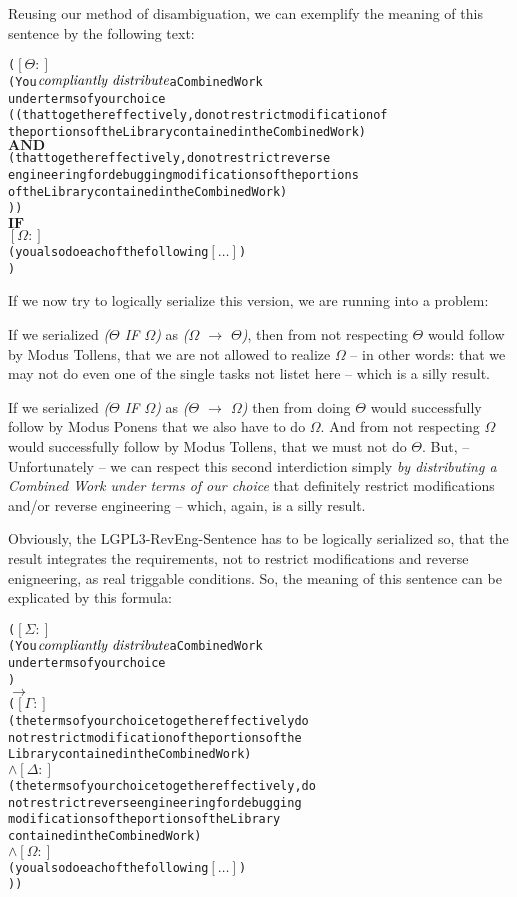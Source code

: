 Reusing our method of disambiguation, we can exemplify the meaning of this
sentence by the following text:

\begin{alltt}   
( \([\Theta:]\)
  ( You \(\emph{compliantly distribute}\) a Combined Work 
    under terms of your choice 
    (   (that together effectively, do not restrict modification of 
        the portions of the Library contained in the Combined Work)
    \(\textbf{AND}\) 
        (that together effectively, do not restrict reverse
        engineering for debugging modifications of the portions
        of the Library contained in the Combined Work)
  )  )
  \(\textbf{IF}\)
  \([\Omega:]\) 
  ( you also do each of the following \([\ldots]\))
)
\end{alltt}

If we now try to logically serialize this version, we are running into a
problem:

If we serialized \emph{($\Theta$ IF $\Omega$)} as \emph{($\Omega$ $\rightarrow$
$\Theta$)}, then from not respecting $\Theta$ would follow by Modus Tollens,
that we are not allowed to realize $\Omega$ -- in other words:
that we may not do even one of the single tasks not listet here -- which is a
silly result. 

If we serialized \emph{($\Theta$ IF $\Omega$)} as \emph{($\Theta$ $\rightarrow$
$\Omega$)} then from doing $\Theta$ would successfully follow by Modus Ponens
that we also have to do $\Omega$. And from not respecting $\Omega$ would
successfully follow by Modus Tollens, that we must not do $\Theta$. But, --
Unfortunately -- we can respect this second interdiction simply \emph{by
distributing a Combined Work under terms of our choice} that definitely restrict
modifications and/or reverse engineering -- which, again, is a silly result.

Obviously, the LGPL3-RevEng-Sentence has to be logically serialized so, that the
result integrates the requirements, not to restrict modifications and reverse
enigneering, as real triggable conditions. So, the meaning of this sentence can
be explicated by this formula:

\begin{alltt}
( \([\Sigma:]\)
  ( You \(\emph{compliantly distribute}\) a Combined Work 
    under terms of your choice 
  ) 
  \(\rightarrow\)  
  (    \([\Gamma:]\)
     ( the terms of your choice together effectively do 
       not restrict modification of the portions of the 
       Library contained in the Combined Work) 
     \(\wedge\) \([\Delta:]\)
     ( the terms of your choice together effectively, do 
       not restrict reverse engineering for debugging 
       modifications of the portions of the Library 
       contained in the Combined Work)
     \(\wedge\) \([\Omega:]\) 
     ( you also do each of the following \([\ldots]\))
) )
\end{alltt}  

